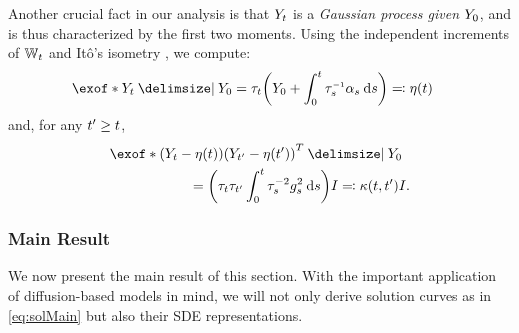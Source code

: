 Another crucial fact in our analysis is that $\refsde$ is a \emph{Gaussian process given $\refsde[0]$}, and is thus characterized by the first two moments. Using the independent increments of $\Wiener$ and It\^o's isometry \citep{protter2005stochastic}, we compute:
\begin{align}
\label{eq:mYdef}
\exof*{  \refsde \given \refsde[0]  } &= \aggtime  \parens*{\refsde[0] +  \int_0^\ctime {\aggtimeinv[\ctimealt]}{ \shift[\ctimealt] } \dd \ctimealt  } \eqdef \mYcinit  
\end{align}and, for any $\ctime' \geq \ctime$, 
\begin{align}
\label{eq:covYdef}
&\exof*{  \parens*{ \refsde - \mYcinit  } \parens*{ \refsde[\ctime']- \mYcinit[\ctime']   }^T  \given \refsde[0] } \\
&\hspace{20mm}= \parens*{\aggtime \aggtime[\ctime'] \intdasq} \eye \eqdef \kernel \eye.
\nn
\end{align}


\subsubsection{Main Result}
\label{sec:GaussianSB-main}

We now present the main result of this section. With the important application of diffusion-based models in mind, we will not only derive solution curves as in \eqref{eq:solMain} but also their \acrshort{SDE} representations.

